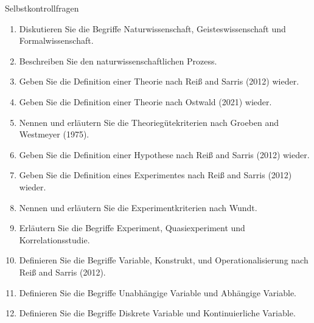 \documentclass[
  8pt,
  ignorenonframetext,
]{beamer}
\providecommand{\tightlist}{%
  \setlength{\itemsep}{0pt}\setlength{\parskip}{0pt}}
\begin{document}
\begin{frame}{Selbstkontrollfragen}
\protect\hypertarget{selbstkontrollfragen}{}
\footnotesize
{}

\begin{enumerate}
\tightlist
\item
  Diskutieren Sie die Begriffe Naturwissenschaft, Geisteswissenschaft
  und Formalwissenschaft.
\item
  Beschreiben Sie den naturwissenschaftlichen Prozess.
\item
  Geben Sie die Definition einer Theorie nach Reiß and Sarris (2012)
  wieder.
\item
  Geben Sie die Definition einer Theorie nach Ostwald (2021) wieder.
\item
  Nennen und erläutern Sie die Theoriegütekriterien nach Groeben and
  Westmeyer (1975).
\item
  Geben Sie die Definition einer Hypothese nach Reiß and Sarris (2012)
  wieder.
\item
  Geben Sie die Definition eines Experimentes nach Reiß and Sarris
  (2012) wieder.
\item
  Nennen und erläutern Sie die Experimentkriterien nach Wundt.
\item
  Erläutern Sie die Begriffe Experiment, Quasiexperiment und
  Korrelationsstudie.
\item
  Definieren Sie die Begriffe Variable, Konstrukt, und
  Operationalisierung nach Reiß and Sarris (2012).
\item
  Definieren Sie die Begriffe Unabhängige Variable und Abhängige
  Variable.
\item
  Definieren Sie die Begriffe Diskrete Variable und Kontinuierliche
  Variable.
\end{enumerate}
\end{frame}
\end{document}
